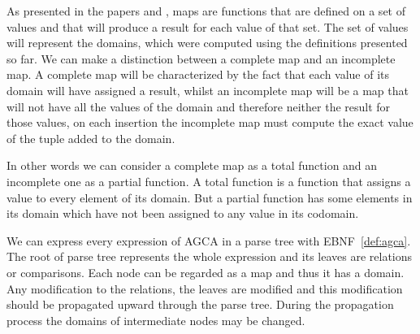 \documentclass[12pt]{article}
\begin{document}
As presented in the papers \cite{1} and \cite{2}, maps are functions that are defined on a set of values and that will produce a result for each value of that set. The set of values will represent the domains, which were computed using the definitions presented so far. We can make a distinction between a complete map and an incomplete map. A complete map will be characterized by the fact that each value of its domain will have assigned a result, whilst an incomplete map will be a map that will not have all the values of the domain and therefore neither the result for those values, on each insertion the incomplete map must compute the exact value of the tuple added to the domain.\\ \par
In other words we can consider a complete map as a total function and an incomplete one as a partial function. A total function is a function that assigns a value to every element of its domain. But a partial function has some elements in its domain which have not been assigned to any value in its codomain. \par

 We can express every expression of AGCA in a parse tree with EBNF~\ref{def:agca}. The root of parse tree represents the whole expression and its leaves are relations or comparisons. Each node can be regarded as a map and thus it has a domain. Any modification to the relations, the leaves are modified and this modification should be propagated upward through the parse tree. During the propagation process the domains of intermediate nodes may be changed. 
\end{document}
